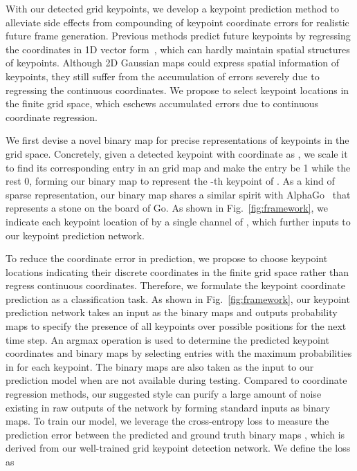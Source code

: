 \documentclass[letterpaper, 10 pt, conference]{ieeeconf}
\begin{document}
With our detected grid keypoints, we develop a keypoint prediction method to alleviate side effects from compounding of keypoint coordinate errors for realistic future frame generation.  
Previous methods predict future keypoints by regressing the coordinates in 1D vector form~\cite{villegas2017learning, minderer2019unsupervised,kim2019unsupervised}, which can hardly maintain spatial structures of keypoints. 
Although 2D Gaussian maps could express spatial information of keypoints, they still suffer from the accumulation of errors severely due to regressing the continuous coordinates. 
We propose to select keypoint locations in the finite grid space, which eschews accumulated errors due to continuous coordinate regression.

We first devise a novel binary map for precise representations of keypoints in the grid space.
Concretely, given a detected keypoint with coordinate as , we scale it to find its corresponding entry in an  grid map and make the entry be 1 while the rest 0, forming our binary map  to represent the -th keypoint of . 
As a kind of sparse representation, our binary map shares a similar spirit with AlphaGo~\cite{silver2017mastering} that represents a stone on the board of Go. 
As shown in Fig.~\ref{fig:framework}, we indicate each keypoint location of  by a single channel of , which further inputs to our keypoint prediction network. 


To reduce the coordinate error in prediction, we propose to choose keypoint locations indicating their discrete coordinates in the finite grid space rather than regress continuous coordinates. 
Therefore, we formulate the keypoint coordinate prediction as a classification task. 
As shown in Fig.~\ref{fig:framework}, our keypoint prediction network takes an input as the binary maps  and outputs probability maps  to specify the presence of all keypoints over possible positions for the next time step. 
An argmax operation is used to determine the predicted keypoint coordinates  and binary maps  by selecting entries with the maximum probabilities in  for each keypoint.
The binary maps  are also taken as the input to our prediction model when  are not available during testing.
Compared to coordinate regression methods, our suggested style can purify a large amount of noise existing in raw outputs of the network by forming standard inputs as binary maps. 
To train our model, we leverage the cross-entropy loss to measure the prediction error between the predicted  and ground truth binary maps , which is derived from our well-trained grid keypoint detection network. We define the loss as
\end{document}
